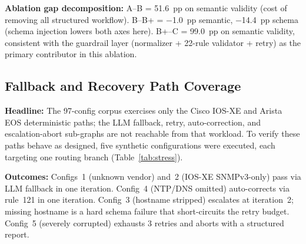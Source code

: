 \documentclass[conference]{IEEEtran}
\begin{document}
\textbf{Ablation gap decomposition:} A--B = 51.6~pp on semantic validity (cost of removing all structured workflow). B--B+ = $-$1.0~pp semantic, $-$14.4~pp schema (schema injection lowers both axes here). B+--C = 99.0~pp on semantic validity, consistent with the guardrail layer (normalizer + 22-rule validator + retry) as the primary contributor in this ablation.

\subsection{Fallback and Recovery Path Coverage}
\label{sec:stress}

\textbf{Headline:} The 97-config corpus exercises only the Cisco IOS-XE and Arista EOS deterministic
paths; the LLM fallback, retry, auto-correction, and escalation-abort sub-graphs
are not reachable from that workload. To verify these paths behave as designed,
five synthetic configurations were executed, each targeting one routing branch
(Table~\ref{tab:stress}).

\textbf{Outcomes:} Configs~1 (unknown vendor) and~2 (IOS-XE SNMPv3-only) pass via LLM fallback in one iteration. Config~4 (NTP/DNS omitted) auto-corrects via rule~121 in one iteration. Config~3 (hostname stripped) escalates at iteration~2; missing hostname is a hard schema failure that short-circuits the retry budget. Config~5 (severely corrupted) exhausts 3 retries and aborts with a structured report.

\begin{table}[htbp]
\centering
\caption{Fallback/recovery stress test (5 synthetic configs). ``Iters'' counts validator iterations before pass or abort. Lat.\ is end-to-end wall-clock per config.}
\label{tab:stress}
\end{table}
\end{document}
